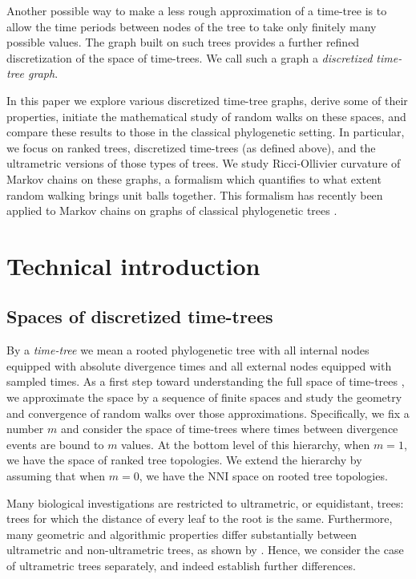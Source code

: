 \documentclass{amsart}
\theoremstyle{definition}
\newcommand{\nni}{\mathrm{NNI}}
\begin{document}
Another possible way to make a less rough approximation of a time-tree is to allow the time periods between nodes of the tree to take only finitely many possible values.
The graph built on such trees provides a further refined discretization of the space of time-trees.
We call such a graph a \emph{discretized time-tree graph}.

In this paper we explore various discretized time-tree graphs, derive some of their properties, initiate the mathematical study of random walks on these spaces, and compare these results to those in the classical phylogenetic setting.
In particular, we focus on ranked trees, discretized time-trees (as defined above), and the ultrametric versions of those types of trees.
We study Ricci-Ollivier curvature \autocite{Ollivier2009-cj} of Markov chains on these graphs, a formalism which quantifies to what extent random walking brings unit balls together.
This formalism has recently been applied to Markov chains on graphs of classical phylogenetic trees \autocite{Whidden2015-es}.


\section{Technical introduction}
\subsection{Spaces of discretized time-trees}

By a {\em time-tree} we mean a rooted phylogenetic tree with all internal nodes equipped with absolute divergence times and all external nodes equipped with sampled times.
As a first step toward understanding the full space of time-trees \autocite{Gavryushkin2014-bw}, we approximate the space by a sequence of finite spaces and study the geometry and convergence of random walks over those approximations.
Specifically, we fix a number $m$ and consider the space of time-trees where times between divergence events are bound to $m$ values.
At the bottom level of this hierarchy, when $m = 1$, we have the space of ranked tree topologies.
We extend the hierarchy by assuming that when $m = 0$, we have the $\nni$ space on rooted tree topologies.

Many biological investigations are restricted to ultrametric, or equidistant, trees: trees for which the distance of every leaf to the root is the same.
Furthermore, many geometric and algorithmic properties differ substantially between ultrametric and non-ultrametric trees, as shown by \textcite{Gavryushkin2014-bw}.
Hence, we consider the case of ultrametric trees separately, and indeed establish further differences.
\end{document}

